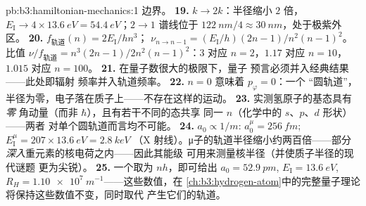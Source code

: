 \begin{solution}{pb:b3:hamiltonian-mechanics:1}
边界。
\textbf{19.} $k \to 2k$：半径缩小 $2$ 倍，$E_{\text{I}} \to
4 \times \qty{13.6}{eV} = \qty{54.4}{eV}$；$2 \to 1$ 谱线位于
$\qty{122}{nm}/4 \approx \qty{30}{nm}$，处于极紫外区。
\textbf{20.} $f_{\text{轨道}}(n) = 2E_{\text{I}}/hn^3$；
$\nu_{n \to n-1} = (E_{\text{I}}/h)(2n - 1)/n^2(n-1)^2$。比值
$\nu/f_{\text{轨道}} = n^3(2n-1)/2n^2(n-1)^2$：$3$ 对应 $n = 2$，$1.17$
对应 $n = 10$，$1.015$ 对应 $n = 100$。
\textbf{21.} 在量子数很大的极限下，量子
预言必须并入经典结果——此处即辐射
频率并入轨道频率。
\textbf{22.} $n = 0$ 意味着 $p_\varphi = 0$：一个
“圆轨道”，半径为零，电子落在质子上——不存在这样的运动。
\textbf{23.} 实测氢原子的基态具有\emph{零}
角动量（而非 $\hbar$），且有若干不同的态共享
同一 $n$（化学中的 $s$、$p$、$d$ 形状）——两者
对单个圆轨道而言均不可能。
\textbf{24.} $a_0 \propto 1/m$: $a_0^\mu = \qty{256}{fm}$;
$E_{\text{I}}^\mu = 207 \times \qty{13.6}{eV} = \qty{2.8}{keV}$
（X 射线）。μ子的轨道半径缩小约两百倍——部分
\emph{深入}重元素的核电荷之内——因此其能级
可用来测量核半径（并使质子半径的现代谜题
更为尖锐）。
\textbf{25.} 一个取为 $nh$，即可给出 $a_0 =
\qty{52.9}{pm}$, $E_{\text{I}} = \qty{13.6}{eV}$, $R_H =
\qty{1.10e7}{m^{-1}}$——这些数值，在
\cref{ch:b3:hydrogen-atom}中的完整量子理论将保持这些数值不变，同时取代
产生它们的轨道。
\end{solution}
